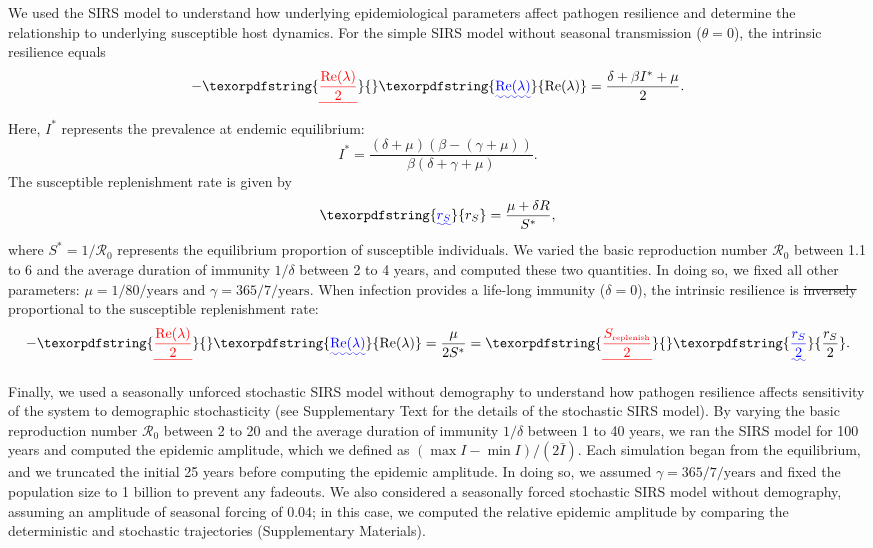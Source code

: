 \documentclass[12pt]{article}
\newcommand{\tsub}[2]{#1_{{\textrm{\tiny #2}}}}
\providecommand{\DIFaddtex}[1]{{\protect\color{blue}\uwave{#1}}} %
\providecommand{\DIFdeltex}[1]{{\protect\color{red}\sout{#1}}}                      %
\providecommand{\DIFaddbegin}{} %
\providecommand{\DIFaddend}{} %
\providecommand{\DIFdelbegin}{} %
\providecommand{\DIFdelend}{} %
\providecommand{\DIFadd}[1]{\texorpdfstring{\DIFaddtex{#1}}{#1}} %
\providecommand{\DIFdel}[1]{\texorpdfstring{\DIFdeltex{#1}}{}} %
\newcommand{\DIFscaledelfig}{0.5}
\newlength{\DIFdelgraphicswidth} %
\newlength{\DIFdelgraphicsheight} %
\newcommand{\DIFaddincludegraphics}[2][]{{\color{blue}\fbox{\DIFOincludegraphics[#1]{#2}}}} %
\newcommand{\DIFdelincludegraphics}[2][]{%
\sbox{\DIFdelgraphicsbox}{\DIFOincludegraphics[#1]{#2}}%
\settoboxwidth{\DIFdelgraphicswidth}{\DIFdelgraphicsbox} %
\settoboxtotalheight{\DIFdelgraphicsheight}{\DIFdelgraphicsbox} %
\scalebox{\DIFscaledelfig}{%
\parbox[b]{\DIFdelgraphicswidth}{\usebox{\DIFdelgraphicsbox}\\[-\baselineskip] \rule{\DIFdelgraphicswidth}{0em}}\llap{\resizebox{\DIFdelgraphicswidth}{\DIFdelgraphicsheight}{%
\setlength{\unitlength}{\DIFdelgraphicswidth}%
\begin{picture}(1,1)%
\thicklines\linethickness{2pt} %
{\color[rgb]{1,0,0}\put(0,0){\framebox(1,1){}}}%
{\color[rgb]{1,0,0}\put(0,0){\line( 1,1){1}}}%
{\color[rgb]{1,0,0}\put(0,1){\line(1,-1){1}}}%
\end{picture}%
}\hspace*{3pt}}} %
} %
\DeclareRobustCommand{\DIFaddbegin}{\DIFOaddbegin \let\includegraphics\DIFaddincludegraphics} %
\DeclareRobustCommand{\DIFaddend}{\DIFOaddend \let\includegraphics\DIFOincludegraphics} %
\DeclareRobustCommand{\DIFdelbegin}{\DIFOdelbegin \let\includegraphics\DIFdelincludegraphics} %
\DeclareRobustCommand{\DIFdelend}{\DIFOaddend \let\includegraphics\DIFOincludegraphics} %
\begin{document}
We used the SIRS model to understand how underlying epidemiological parameters affect pathogen resilience and determine the relationship to underlying susceptible host dynamics.
For the simple SIRS model without seasonal transmission ($\theta = 0$), the intrinsic resilience equals
\begin{equation}
-\DIFdelbegin \DIFdel{\frac{\mathrm{Re}(\lambda)}{2} }\DIFdelend \DIFaddbegin \DIFadd{\mathrm{Re}(\lambda) }\DIFaddend = \frac{\delta + \beta I^{\ast} + \mu}{2}.
\end{equation}
Here, $I^{\ast}$ represents the prevalence at endemic equilibrium:
\begin{equation}
I^{\ast} = \frac{(\delta + \mu)(\beta - (\gamma + \mu))}{\beta(\delta + \gamma + \mu)}.
\end{equation}
The susceptible replenishment rate is given by
\begin{equation}
\DIFdelbegin %
\DIFdelend \DIFaddbegin \DIFadd{r_S }\DIFaddend = \frac{\mu + \delta R}{S^\ast},
\end{equation}
where $S^\ast = 1/\mathcal R_0$ represents the equilibrium proportion of susceptible individuals.
We varied the basic reproduction number $\mathcal R_0$ between 1.1 to 6 and the average duration of immunity $1/\delta$ between 2 to 4 years, and computed these two quantities.
In doing so, we fixed all other parameters: $\mu=1/80/\mathrm{years}$ and $\gamma=365/7/\mathrm{years}$.
When infection provides a life-long immunity ($\delta = 0$), the \DIFaddbegin \DIFadd{model collapses to the SIR model and the }\DIFaddend intrinsic resilience is \DIFdelbegin \DIFdel{inversely }\DIFdelend \DIFaddbegin \DIFadd{exactly }\DIFaddend proportional to the susceptible replenishment rate:
\begin{equation}
-\DIFdelbegin \DIFdel{\frac{\mathrm{Re}(\lambda)}{2} }\DIFdelend \DIFaddbegin \DIFadd{\mathrm{Re}(\lambda) }\DIFaddend = \frac{\mu}{2 S^\ast} = \DIFdelbegin \DIFdel{\frac{\tsub{S}{replenish}}{2}}\DIFdelend \DIFaddbegin \DIFadd{\frac{r_S}{2}}\DIFaddend .
\end{equation}

Finally, we used a seasonally unforced stochastic SIRS model without demography to understand how pathogen resilience affects sensitivity of the system to demographic stochasticity (see Supplementary Text for the details of the stochastic SIRS model).
By varying the basic reproduction number $\mathcal R_0$ between 2 to 20 and the average duration of immunity $1/\delta$ between 1 to 40 years, we ran the SIRS model for 100 years and computed the epidemic amplitude, which we defined as  $(\max I - \min I)/(2 \bar{I})$.
Each simulation began from the equilibrium, and we truncated the initial 25 years before computing the epidemic amplitude.
In doing so, we assumed $\gamma=365/7/\mathrm{years}$ and fixed the population size to 1 billion to prevent any fadeouts.
We also considered a seasonally forced stochastic SIRS model without demography, assuming an amplitude of seasonal forcing of $0.04$;
in this case, we computed the relative epidemic amplitude by comparing the deterministic and stochastic trajectories (Supplementary Materials).
\end{document}
